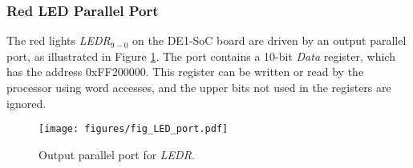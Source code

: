 \subsubsection{Red LED Parallel Port}

The red lights {\it LEDR}$_{9-0}$ on the DE1-SoC board
are driven by an output parallel port, as illustrated in Figure \ref{fig:LED_port}. The port
contains a 10-bit {\it Data} register, which has the
address {\sf 0xFF200000}.  This register can be written or read by the processor using word 
accesses, and the upper bits not used in the registers are ignored.

\begin{figure}[h!]
   \begin{center}
       \texttt{[image: figures/fig\_LED\_port.pdf]}
   \end{center}
   \caption{Output parallel port for {\it LEDR}.}
	\label{fig:LED_port}
\end{figure}


